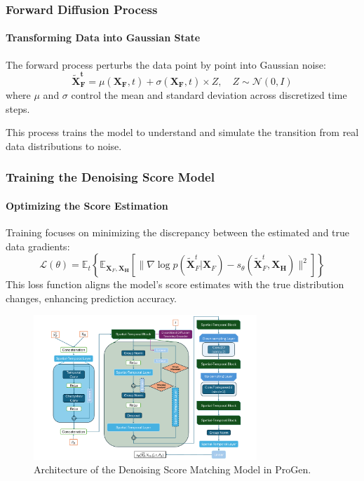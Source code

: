 \documentclass[light]{lutbeamer} %
\begin{document}
\begin{frame}
    \frametitle{Forward Diffusion Process}
    \framesubtitle{Transforming Data into Gaussian State}

    The forward process perturbs the data point by point into Gaussian noise:
    \begin{equation}
        \mathbf{\tilde{X}^t_{F}} = \mu(\mathbf{X_{F}}, t) + \sigma(\mathbf{X_{F}}, t) \times Z, \quad Z \sim \mathcal{N}(0, I)
    \end{equation}
    where \(\mu\) and \(\sigma\) control the mean and standard deviation across discretized time steps.

    This process trains the model to understand and simulate the transition from real data distributions to noise.
\end{frame}

\begin{frame}
    \frametitle{Training the Denoising Score Model}
    \framesubtitle{Optimizing the Score Estimation}

    Training focuses on minimizing the discrepancy between the estimated and true data gradients:
    \begin{equation}
        \mathcal{L}(\theta) = \mathbb{E}_{t} \left\{ \mathbb{E}_{\mathbf{X}_{F}, \mathbf{X_H}} \left[ \|\nabla \log p(\tilde{\mathbf{X}}_{F}^t | \mathbf{X}_{F}) - s_\theta(\tilde{\mathbf{X}}_{F}^t, \mathbf{X_H})\|^2 \right] \right\}
    \end{equation}
    This loss function aligns the model's score estimates with the true distribution changes, enhancing prediction accuracy.

    \begin{figure}[ht]
        \centering
        \includegraphics[width=0.75\textwidth]{figures/ProGen_model.pdf}
        \caption{Architecture of the Denoising Score Matching Model in ProGen.}
        \label{fig:model}
    \end{figure}

\end{frame}
\end{document}

